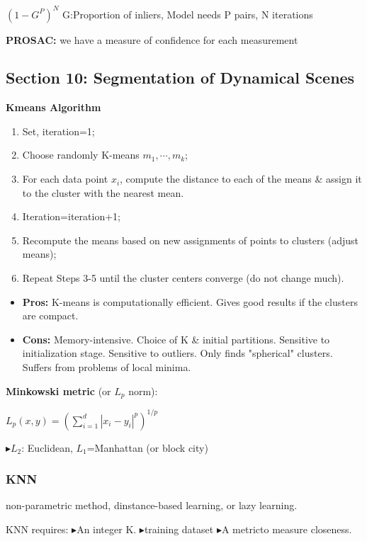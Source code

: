 \documentclass{../cheat}
\def \itm{{\tiny$\blacktriangleright$}}
\begin{document}
\begin{multicols}{3}
	$(1-G^P)^N$ G:Proportion of inliers, Model needs P pairs, N iterations
	
	\textbf{PROSAC:} we have a measure of confidence for each measurement
	
	\subsection{Section 10: Segmentation of Dynamical Scenes}
	\textbf{Kmeans Algorithm}
	\begin{enumerate}[nolistsep, leftmargin=1em]	
		\item Set, iteration=1;
		\item Choose randomly K-means $m_1, \cdots, m_k$;
		\item For each data point $x_i$, compute the distance to each of the means \& assign it to the cluster with the nearest mean.
		\item Iteration=iteration+1;
		\item Recompute the means based on new assignments of points to clusters (adjust means);
		\item Repeat Steps 3-5 until the cluster centers converge (do not change much).
	\end{enumerate}
	
	\begin{itemize}[nolistsep, leftmargin=1em]
		\item \textbf{Pros:}
			 K-means is computationally efficient.
			 Gives good results if the clusters are compact.
		\item \textbf{Cons:}
			 Memory-intensive.
			 Choice of K \& initial partitions.
			 Sensitive to initialization stage.
			 Sensitive to outliers.
			 Only finds "spherical" clusters.
			 Suffers from problems of local minima.
	\end{itemize}

	\textbf{Minkowski metric} (or $L_p$ norm): \\
		\centerline{$L_p(x,y)=(\sum_{i=1}^d |x_i-y_i|^p)^{1/p}$}
	
	\itm $L_2$: Euclidean, $L_1$=Manhattan (or block city)
	
	\subsubsection{KNN}
	non-parametric method, dinstance-based learning, or lazy learning.
	
	KNN requires: 
	\itm An integer K.
	\itm training dataset
	\itm A metricto measure closeness.
	

\end{multicols}
\end{document}
